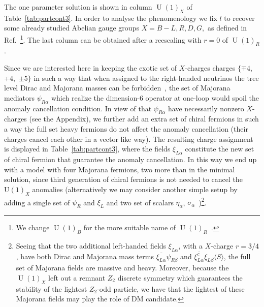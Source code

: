 \documentclass[12pt]{article}
\begin{document}
The one parameter solution is shown in  column $\operatorname{U}(1)_X$
of Table~\ref{tab:partcont3}.
In order to analyse the phenomenology we fix $l$ to recover some already studied
Abelian gauge groups $X=B-L,R,D,G,$ as defined in Ref.~\cite{Campos:2017dgc}\footnote{We change $\operatorname{U}(1)_B$ for the more suitable name of $\operatorname{U}(1)_R$~\cite{Jana:2019mez}.}. The last column can be obtained after a reescaling with $r=0$ of $\operatorname{U}(1)_R$.

Since we are interested here in keeping the exotic set of $X$-charges
charges $\{\mp 4$,~$\mp 4$,~$\pm 5\}$ in such a way that when assigned
to the right-handed neutrinos the tree level Dirac and Majorana masses
can be forbidden~\cite{Calle:2018ovc}, the set of Majorana mediators
$\psi_{R\alpha}$ which realize the dimension-6 operator at one-loop
 would spoil the anomaly cancellation
condition.
In view of that $\psi_{R\alpha}$ have necessarily nonzero $X$-charges (see the Appendix), we further add an extra set of chiral fermions in 
such a way the full set heavy fermions  do not affect
the anomaly cancellation (their charges cancel each other in a vector like way). 
The resulting charge assignment is displayed in
Table~\ref{tab:partcont3}, where 
the fields $\xi_{L \alpha}$ constitute the new set of chiral fermion that guarantee the anomaly cancellation.
In this way we end up with a model with four Majorana fermions, two more than in the minimal solution, since third generation of chiral fermions is not needed to cancel the $\operatorname{U(1)}_X$ anomalies (alternatively we may consider another simple setup by adding a single set of $\psi_R$ and $\xi_L$ and two set of scalars $\eta_\alpha$, $\sigma_{\alpha}$~\cite{Reig:2018mdk})\footnote{
Seeing that the two additional left-handed fields $\xi_{L\alpha}$,  with a $X$-charge $r=3/4$,  have both Dirac and Majorana mass terms $\overline{\xi_{L \alpha}}\psi_{R \beta}$ and $ \overline{\xi_{L\alpha}^c }\xi_{L \beta} \langle S\rangle$, the full set of Majorana fields are massive and heavy. 
Moreover, because the $\operatorname{U}(1)_{X}$ left out a remnant $Z_2$ discrete symmetry which guarantees the stability of the lightest $Z_2$-odd particle,  we have that the lightest of these Majorana fields may play the role of DM candidate.}.



\end{document}
